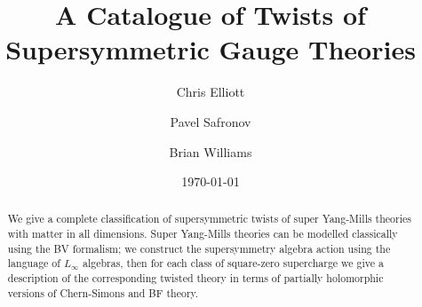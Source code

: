 \documentclass[10pt, oneside]{article}
\title{A Catalogue of Twists of Supersymmetric Gauge Theories}
\author{Chris Elliott\and Pavel Safronov \and Brian Williams}
\date{\today}
\begin{document}
\maketitle

\begin{abstract}
We give a complete classification of supersymmetric twists of super Yang-Mills theories with matter in all dimensions.  Super Yang-Mills theories can be modelled classically using the BV formalism; we construct the supersymmetry algebra action using the language of $L_\infty$ algebras, then for each class of square-zero supercharge we give a description of the corresponding twisted theory in terms of partially holomorphic versions of Chern-Simons and BF theory. 
\end{abstract}

\tableofcontents
\end{document}
